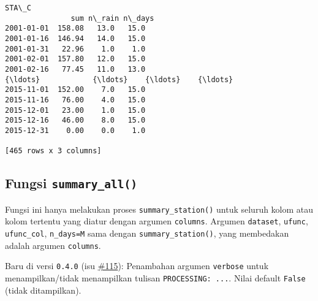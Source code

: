 \documentclass[11pt]{article}
\makeatletter
\newcommand{\boxspacing}{\kern\kvtcb@left@rule\kern\kvtcb@boxsep}
\newcommand{\prompt}[4]{
        {\ttfamily\llap{{\color{#2}[#3]:\hspace{3pt}#4}}\vspace{-\baselineskip}}
    }
\makeatother
\begin{document}
            \begin{tcolorbox}[breakable, size=fbox, boxrule=.5pt, pad at break*=1mm, opacityfill=0]
\prompt{Out}{outcolor}{ }{\boxspacing}
\begin{Verbatim}[commandchars=\\\{\}]
             STA\_C
               sum n\_rain n\_days
2001-01-01  158.08   13.0   15.0
2001-01-16  146.94   14.0   15.0
2001-01-31   22.96    1.0    1.0
2001-02-01  157.80   12.0   15.0
2001-02-16   77.45   11.0   13.0
{\ldots}            {\ldots}    {\ldots}    {\ldots}
2015-11-01  152.00    7.0   15.0
2015-11-16   76.00    4.0   15.0
2015-12-01   23.00    1.0   15.0
2015-12-16   46.00    8.0   15.0
2015-12-31    0.00    0.0    1.0

[465 rows x 3 columns]
\end{Verbatim}
\end{tcolorbox}
        
    \hypertarget{fungsi-summary_all}{%
\subsection{\texorpdfstring{Fungsi
\texttt{summary\_all()}}{Fungsi summary\_all()}}\label{fungsi-summary_all}}

Fungsi ini hanya melakukan proses \texttt{summary\_station()} untuk
seluruh kolom atau kolom tertentu yang diatur dengan argumen
\texttt{columns}. Argumen \texttt{dataset}, \texttt{ufunc},
\texttt{ufunc\_col},
\texttt{n\_days=\textquotesingle{}M\textquotesingle{}} sama dengan
\texttt{summary\_station()}, yang membedakan adalah argumen
\texttt{columns}.

Baru di versi \texttt{0.4.0} (isu
\href{https://github.com/hidrokit/hidrokit/issues/115}{\#115}):
Penambahan argumen \texttt{verbose} untuk menampilkan/tidak menampilkan
tulisan \texttt{PROCESSING:\ ...}. Nilai default \texttt{False} (tidak
ditampilkan).
\end{document}
